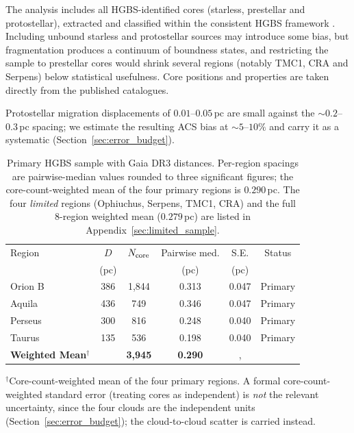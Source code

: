 \documentclass[usenatbib,twoside,twocolumn]{mnras}
\begin{document}
The analysis includes all HGBS-identified cores (starless, prestellar and protostellar), extracted and classified within the consistent HGBS framework \citep{Konyves2015, Konyves2020}. Including unbound starless and protostellar sources may introduce some bias, but fragmentation produces a continuum of boundness states, and restricting the sample to prestellar cores would shrink several regions (notably TMC1, CRA and Serpens) below statistical usefulness. Core positions and properties are taken directly from the published catalogues.

Protostellar migration displacements of $0.01$--$0.05$\,pc \citep{Kirk2016, Mattern2018} are small against the $\sim0.2$--$0.3$\,pc spacing; we estimate the resulting ACS bias at $\sim5$--$10\%$ and carry it as a systematic (Section~\ref{sec:error_budget}).

\begin{table}
\caption{Primary HGBS sample with Gaia DR3 distances. Per-region spacings are pairwise-median values rounded to three significant figures; the core-count-weighted mean of the four primary regions is $0.290$\,pc. The four \emph{limited} regions (Ophiuchus, Serpens, TMC1, CRA) and the full 8-region weighted mean ($0.279$\,pc) are listed in Appendix~\ref{sec:limited_sample}.}
\label{tab:sample}
\footnotesize
\setlength{\tabcolsep}{3pt}
\begin{tabular}{lccccc}
\toprule
Region & $D$ & $N_{\rm core}$ & Pairwise med. & S.E. & Status \\
       & (pc) &  & (pc) & (pc) &  \\
\midrule
Orion B  & 386 & 1,844 & 0.313 & 0.047 & Primary \\
Aquila   & 436 & 749   & 0.346 & 0.047 & Primary \\
Perseus  & 300 & 816   & 0.248 & 0.040 & Primary \\
Taurus   & 135 & 536   & 0.198 & 0.040 & Primary \\
\midrule
\textbf{Weighted Mean}$^\dagger$ &  & \textbf{3,945} & \textbf{0.290} &, &  \\
\bottomrule
\end{tabular}
\par\vspace{2pt}
\footnotesize $^\dagger$Core-count-weighted mean of the four primary regions. A formal core-count-weighted standard error (treating cores as independent) is \emph{not} the relevant uncertainty, since the four clouds are the independent units (Section~\ref{sec:error_budget}); the cloud-to-cloud scatter is carried instead.
\end{table}
\end{document}
